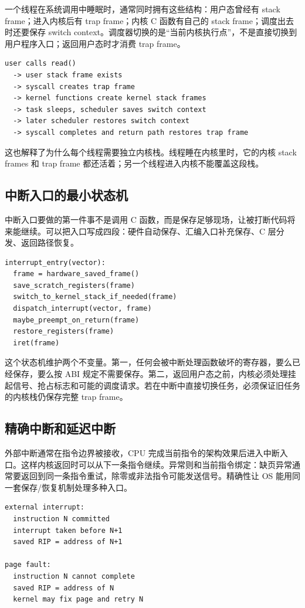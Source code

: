 一个线程在系统调用中睡眠时，通常同时拥有这些结构：用户态曾经有 stack frame；进入内核后有 trap frame；内核 C 函数有自己的 stack frame；调度出去时还要保存 switch context。调度器切换的是“当前内核执行点”，不是直接切换到用户程序入口；返回用户态时才消费 trap frame。

\begin{lstlisting}
user calls read()
  -> user stack frame exists
  -> syscall creates trap frame
  -> kernel functions create kernel stack frames
  -> task sleeps, scheduler saves switch context
  -> later scheduler restores switch context
  -> syscall completes and return path restores trap frame
\end{lstlisting}

这也解释了为什么每个线程需要独立内核栈。线程睡在内核里时，它的内核 stack frames 和 trap frame 都还活着；另一个线程进入内核不能覆盖这段栈。

\subsection{中断入口的最小状态机}

中断入口要做的第一件事不是调用 C 函数，而是保存足够现场，让被打断代码将来能继续。可以把入口写成四段：硬件自动保存、汇编入口补充保存、C 层分发、返回路径恢复。

\begin{lstlisting}
interrupt_entry(vector):
  frame = hardware_saved_frame()
  save_scratch_registers(frame)
  switch_to_kernel_stack_if_needed(frame)
  dispatch_interrupt(vector, frame)
  maybe_preempt_on_return(frame)
  restore_registers(frame)
  iret(frame)
\end{lstlisting}

这个状态机维护两个不变量。第一，任何会被中断处理函数破坏的寄存器，要么已经保存，要么按 ABI 规定不需要保存。第二，返回用户态之前，内核必须处理挂起信号、抢占标志和可能的调度请求。若在中断中直接切换任务，必须保证旧任务的内核栈仍保存完整 trap frame。

\subsection{精确中断和延迟中断}

外部中断通常在指令边界被接收，CPU 完成当前指令的架构效果后进入中断入口。这样内核返回时可以从下一条指令继续。异常则和当前指令绑定：缺页异常通常要返回到同一条指令重试，除零或非法指令可能发送信号。精确性让 OS 能用同一套保存/恢复机制处理多种入口。

\begin{lstlisting}
external interrupt:
  instruction N committed
  interrupt taken before N+1
  saved RIP = address of N+1

page fault:
  instruction N cannot complete
  saved RIP = address of N
  kernel may fix page and retry N
\end{lstlisting}

